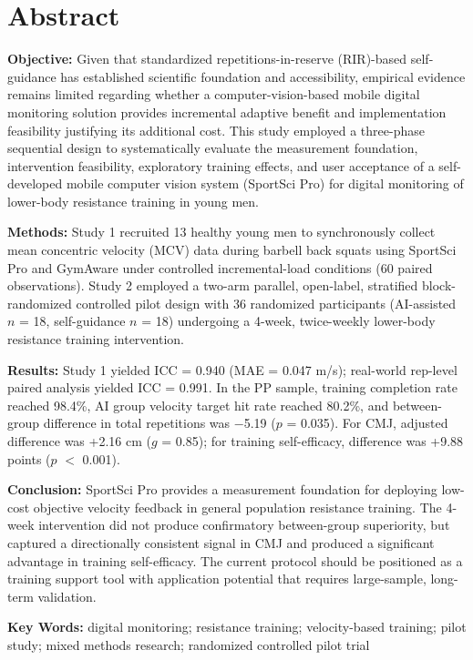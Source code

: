 
\chapter*{Abstract}

\textbf{Objective:} Given that standardized repetitions-in-reserve (RIR)-based self-guidance has established scientific foundation and accessibility, empirical evidence remains limited regarding whether a computer-vision-based mobile digital monitoring solution provides incremental adaptive benefit and implementation feasibility justifying its additional cost. This study employed a three-phase sequential design to systematically evaluate the measurement foundation, intervention feasibility, exploratory training effects, and user acceptance of a self-developed mobile computer vision system (SportSci Pro) for digital monitoring of lower-body resistance training in young men.

\textbf{Methods:} Study 1 recruited 13 healthy young men to synchronously collect mean concentric velocity (MCV) data during barbell back squats using SportSci Pro and GymAware under controlled incremental-load conditions (60 paired observations). Study 2 employed a two-arm parallel, open-label, stratified block-randomized controlled pilot design with 36 randomized participants (AI-assisted $n$ = 18, self-guidance $n$ = 18) undergoing a 4-week, twice-weekly lower-body resistance training intervention.

\textbf{Results:} Study 1 yielded ICC = 0.940 (MAE = 0.047 m/s); real-world rep-level paired analysis yielded ICC = 0.991. In the PP sample, training completion rate reached 98.4\%, AI group velocity target hit rate reached 80.2\%, and between-group difference in total repetitions was $-$5.19 ($p$ = 0.035). For CMJ, adjusted difference was +2.16 cm ($g$ = 0.85); for training self-efficacy, difference was +9.88 points ($p$ $<$ 0.001).

\textbf{Conclusion:} SportSci Pro provides a measurement foundation for deploying low-cost objective velocity feedback in general population resistance training. The 4-week intervention did not produce confirmatory between-group superiority, but captured a directionally consistent signal in CMJ and produced a significant advantage in training self-efficacy. The current protocol should be positioned as a training support tool with application potential that requires large-sample, long-term validation.


\textbf{Key Words:} digital monitoring; resistance training; velocity-based training; pilot study; mixed methods research; randomized controlled pilot trial
